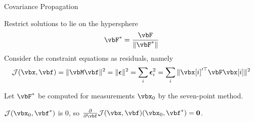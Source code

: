 \documentclass[8pt,aspectratio=169]{beamer}
\begin{document}
\begin{frame}{Covariance Propagation}
  \medskip
  
  Restrict solutions to lie on the hypersphere
  \[
    \vbF^{*} = \frac{\vbF}{\| \vbF^{*} \|}
  \]
  Consider the constraint equations as residuals, namely
  \[
  \mathcal{J}(\vbx,\vbf)= \| \vbM\vbf \|^2 = \|\vbepsilon \|^2 = \sum_i \vbepsilon_i^2  = \sum_i \| \vbx[i]^{\prime \T} \vbF \vbx[i] \|^2
  \]
  
  Let $\vbF^{*}$ be computed for measurements $\vbx_0$ by the seven-point method.
  \bigskip

  $\mathcal{J}(\vbx_0,\vbf^*)$ is 0, so  $\pdv*{\mathcal{J}(\vbx,\vbf)}{\vbf}{(\vbx_0,\vbf^*)} = \vbzero$.
\end{frame}

%
%  
%
%  
%
%
%
%
%
\end{document}
